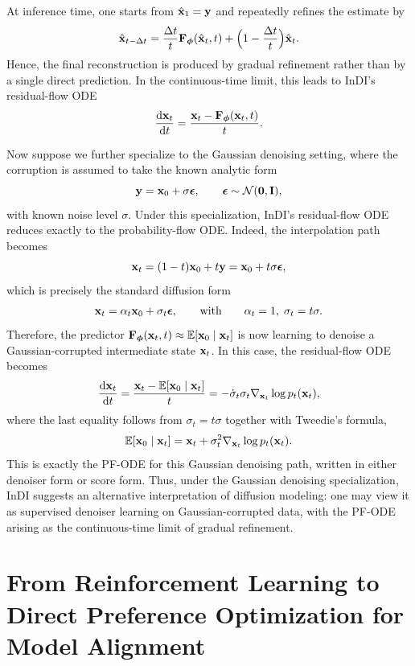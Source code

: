At inference time, one starts from $\hat{{\mathbf{x}}}_1={\mathbf{y}}$ and repeatedly refines the estimate by
\[
\hat{{\mathbf{x}}}_{t-\Delta t}
=
\frac{\Delta t}{t}{\mathbf{F}}_{{\bm{\phi}}}(\hat{{\mathbf{x}}}_t,t)
+
\Bigl(1-\frac{\Delta t}{t}\Bigr)\hat{{\mathbf{x}}}_t.
\]
Hence, the final reconstruction is produced by gradual refinement rather than by a single direct prediction. In the continuous-time limit, this leads to InDI's residual-flow ODE
\[
\frac{\mathop{}\!\mathrm{d} {\mathbf{x}}_t}{\mathop{}\!\mathrm{d} t}
=
\frac{{\mathbf{x}}_t-{\mathbf{F}}_{{\bm{\phi}}}({\mathbf{x}}_t,t)}{t}.
\]

Now suppose we further specialize to the Gaussian denoising setting, where the corruption is assumed to take the known analytic form
\[
{\mathbf{y}}={\mathbf{x}}_0+\sigma{\bm{\epsilon}},
\qquad {\bm{\epsilon}}\sim\mathcal N(\bm 0,{\mathbf{I}}),
\]
with known noise level \(\sigma\). Under this specialization, InDI's residual-flow ODE reduces exactly to the probability-flow ODE. Indeed, the interpolation path becomes
\[
{\mathbf{x}}_t=(1-t){\mathbf{x}}_0+t{\mathbf{y}}
=
{\mathbf{x}}_0+t\sigma{\bm{\epsilon}},
\]
which is precisely the standard diffusion form
\[
{\mathbf{x}}_t=\alpha_t{\mathbf{x}}_0+\sigma_t{\bm{\epsilon}},
\qquad\text{with}\qquad
\alpha_t=1,\;\sigma_t=t\sigma.
\]
Therefore, the predictor \({\mathbf{F}}_{{\bm{\phi}}}({\mathbf{x}}_t,t)\approx \mathbb E[{\mathbf{x}}_0\mid {\mathbf{x}}_t]\) is now learning to denoise a Gaussian-corrupted intermediate state \({\mathbf{x}}_t\). In this case, the residual-flow ODE becomes
\[
\frac{\mathop{}\!\mathrm{d} {\mathbf{x}}_t}{\mathop{}\!\mathrm{d} t}
=
\frac{{\mathbf{x}}_t-\mathbb E[{\mathbf{x}}_0\mid {\mathbf{x}}_t]}{t}
=
-\dot{\sigma}_t\sigma_t\nabla_{{\mathbf{x}}_t}\log p_t({\mathbf{x}}_t),
\]
where the last equality follows from \(\sigma_t=t\sigma\) together with Tweedie's formula,
\[
\mathbb E[{\mathbf{x}}_0\mid {\mathbf{x}}_t]
=
{\mathbf{x}}_t+\sigma_t^2\nabla_{{\mathbf{x}}_t}\log p_t({\mathbf{x}}_t).
\]
This is exactly the PF-ODE for this Gaussian denoising path, written in either denoiser form or score form. Thus, under the Gaussian denoising specialization, InDI suggests an alternative interpretation of diffusion modeling: one may view it as supervised denoiser learning on Gaussian-corrupted data, with the PF-ODE arising as the continuous-time limit of gradual refinement.



\newpage
\section{From Reinforcement Learning to Direct Preference Optimization for Model Alignment}\label{sec:rlhf-dpo}



